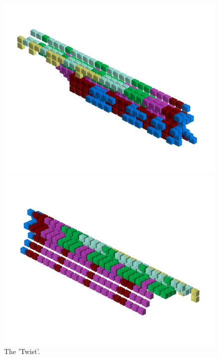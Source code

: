 \begin{figure}[H]
    \centering
    \begin{adjustbox}{width=13cm,center}
      \includegraphics[width=12cm]{src/patterns/pattern1-45.png}%
    \end{adjustbox}
    \begin{adjustbox}{width=13cm,margin=0cm -4cm}
      \includegraphics[width=12cm]{src/patterns/pattern1-225.png}%
    \end{adjustbox}
\caption{The 'Twist'.}
\end{figure}
\clearpage

